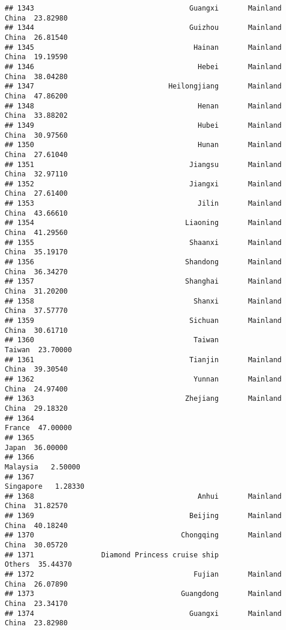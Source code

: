 \documentclass[
]{article}
\begin{document}
\begin{verbatim}
## 1343                                     Guangxi       Mainland China  23.82980
## 1344                                     Guizhou       Mainland China  26.81540
## 1345                                      Hainan       Mainland China  19.19590
## 1346                                       Hebei       Mainland China  38.04280
## 1347                                Heilongjiang       Mainland China  47.86200
## 1348                                       Henan       Mainland China  33.88202
## 1349                                       Hubei       Mainland China  30.97560
## 1350                                       Hunan       Mainland China  27.61040
## 1351                                     Jiangsu       Mainland China  32.97110
## 1352                                     Jiangxi       Mainland China  27.61400
## 1353                                       Jilin       Mainland China  43.66610
## 1354                                    Liaoning       Mainland China  41.29560
## 1355                                     Shaanxi       Mainland China  35.19170
## 1356                                    Shandong       Mainland China  36.34270
## 1357                                    Shanghai       Mainland China  31.20200
## 1358                                      Shanxi       Mainland China  37.57770
## 1359                                     Sichuan       Mainland China  30.61710
## 1360                                      Taiwan               Taiwan  23.70000
## 1361                                     Tianjin       Mainland China  39.30540
## 1362                                      Yunnan       Mainland China  24.97400
## 1363                                    Zhejiang       Mainland China  29.18320
## 1364                                                           France  47.00000
## 1365                                                            Japan  36.00000
## 1366                                                         Malaysia   2.50000
## 1367                                                        Singapore   1.28330
## 1368                                       Anhui       Mainland China  31.82570
## 1369                                     Beijing       Mainland China  40.18240
## 1370                                   Chongqing       Mainland China  30.05720
## 1371                Diamond Princess cruise ship               Others  35.44370
## 1372                                      Fujian       Mainland China  26.07890
## 1373                                   Guangdong       Mainland China  23.34170
## 1374                                     Guangxi       Mainland China  23.82980

\end{verbatim}
\end{document}
